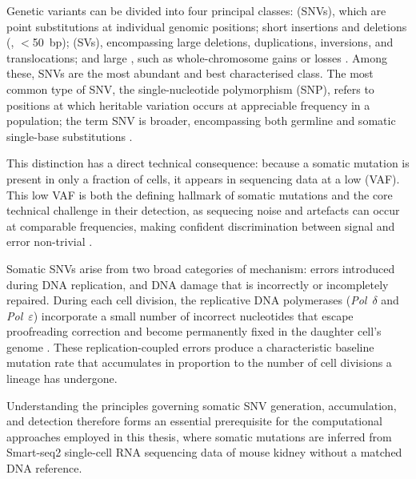 Genetic variants can be divided into four principal classes:  (SNVs), which are point substitutions at individual genomic positions; short insertions and deletions (, $<$50~bp);  (SVs), encompassing large deletions, duplications, inversions, and translocations; and large , such as whole-chromosome gains or losses \parencite{Xureviewsomatic2018, YuGeneticvariation2024}.
Among these, SNVs are the most abundant and best characterised class. The most common type of SNV, the single-nucleotide polymorphism (SNP), refers to positions at which heritable variation occurs at appreciable frequency in a population; the term SNV is broader, encompassing both germline and somatic single-base substitutions \parencite{ZouSignificanceSingleNucleotide2020}.

This distinction has a direct technical consequence: because a somatic mutation is present in only a fraction of cells, it appears in sequencing data at a low  (VAF). 
This low VAF is both the defining hallmark of somatic mutations and the core technical challenge in their detection, as sequecing noise and artefacts can occur at comparable frequencies, making confident discrimination between signal and error non-trivial \parencite{MuyasDenovodetection2024, Xureviewsomatic2018}.

Somatic SNVs arise from two broad categories of mechanism: errors introduced during DNA replication, and DNA damage that is incorrectly or incompletely repaired. 
During each cell division, the replicative DNA polymerases (\textit{Pol}~$\delta$ and \textit{Pol}~$\varepsilon$) incorporate a small number of incorrect nucleotides that escape proofreading correction and become permanently fixed in the daughter cell's genome \parencite{ParkPOLEproofreading2019}. 
These replication-coupled errors produce a characteristic baseline mutation rate that accumulates in proportion to the number of cell divisions a lineage has undergone. 


Understanding the principles governing somatic SNV generation, accumulation, and detection therefore forms an essential prerequisite for the computational approaches employed in this thesis, where somatic mutations are inferred from Smart-seq2 single-cell RNA sequencing data of mouse kidney without a matched DNA reference.

